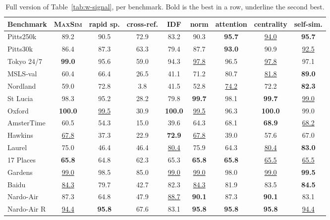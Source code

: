 \begin{table}[H]
\caption{Full version of Table~\ref{tab:w-signal}, per benchmark. Bold is the best in a row, underline the second best.}
\label{tab:w-signal-full}
\centering
{\scriptsize\setlength{\tabcolsep}{3.5pt}
\begin{tabular}{l cccccccc}
\toprule
Benchmark & \textsc{MaxSim} & rapid sp. & cross-ref. & IDF & norm & attention & centrality & self-sim. \\
\midrule
Pitts250k & 89.2 & 90.5 & 72.9 & 83.2 & 90.3 & \textbf{95.7} & \underline{94.0} & \textbf{95.7} \\
Pitts30k & 86.4 & 87.3 & 63.3 & 79.4 & 87.7 & \textbf{93.0} & 90.9 & \underline{92.5} \\
Tokyo 24/7 & \textbf{99.0} & 95.6 & 59.0 & 94.3 & \underline{97.8} & 96.5 & \underline{97.8} & 97.1 \\
MSLS-val & 60.4 & 66.4 & 26.5 & 41.1 & 71.2 & 80.7 & \underline{81.8} & \textbf{89.0} \\
Nordland & 59.0 & 72.8 & 3.8 & 41.5 & 52.8 & \underline{74.2} & 72.2 & \textbf{82.3} \\
St Lucia & 98.3 & 95.2 & 28.2 & 79.8 & \textbf{99.7} & 98.1 & \textbf{99.7} & \underline{99.0} \\
Oxford & \textbf{100.0} & \underline{99.5} & 30.9 & \textbf{100.0} & \underline{99.5} & 96.3 & \textbf{100.0} & 99.0 \\
AmsterTime & 60.5 & 54.3 & 15.0 & 39.6 & 64.3 & 68.1 & \textbf{68.9} & \underline{68.2} \\
\midrule
Hawkins & \underline{67.8} & 37.3 & 22.9 & \textbf{72.9} & \underline{67.8} & 39.0 & 57.6 & 67.0 \\
Laurel & 75.0 & 46.4 & 46.4 & \underline{80.4} & 75.9 & 64.3 & \underline{80.4} & \textbf{83.0} \\
17 Places & \textbf{65.8} & 64.8 & 62.3 & 65.3 & \textbf{65.8} & \textbf{65.8} & \underline{65.5} & \underline{65.5} \\
Gardens & \underline{99.0} & 98.5 & 85.0 & \underline{99.0} & \underline{99.0} & 98.0 & \underline{99.0} & \textbf{99.5} \\
Baidu & \underline{84.3} & 79.7 & 42.7 & 82.3 & \underline{84.3} & 81.9 & 83.5 & \textbf{84.5} \\
Nardo-Air & 87.3 & 64.8 & 47.9 & \underline{88.7} & \textbf{90.1} & 87.3 & \textbf{90.1} & 83.1 \\
Nardo-Air R & \underline{94.4} & \textbf{95.8} & 67.6 & 83.1 & \textbf{95.8} & \textbf{95.8} & \textbf{95.8} & \underline{94.4} \\

\end{tabular}}
\end{table}
